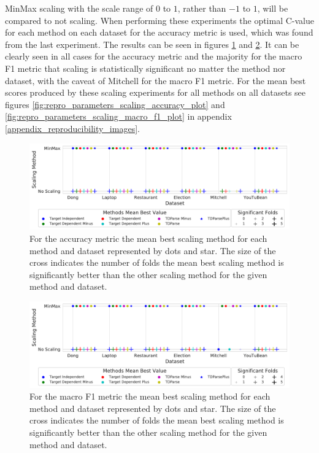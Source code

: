 MinMax scaling with the scale range of $0$ to $1$, rather than \citet{wang-etal-2017-tdparse} $-1$ to $1$, will be compared to not scaling. When performing these experiments the optimal C-value for each method on each dataset for the accuracy metric is used, which was found from the last experiment. The results can be seen in figures \ref{fig:repro_parameters_scaling_accuracy} and \ref{fig:repro_parameters_scaling_macro_f1}. It can be clearly seen in all cases for the accuracy metric and the majority for the macro F1 metric that scaling is statistically significant no matter the method nor dataset, with the caveat of Mitchell for the macro F1 metric. For the mean best scores produced by these scaling experiments for all methods on all datasets see figures \ref{fig:repro_parameters_scaling_accuracy_plot} and \ref{fig:repro_parameters_scaling_macro_f1_plot} in appendix \ref{appendix_reproducibility_images}.

\begin{figure}[!h]
    \centering
    \includegraphics[scale=0.47]{images/reproducibility/Parameters/Scaling/Scaling_Sig_Plot_Accuracy.pdf}
    \caption{For the accuracy metric the mean best scaling method for each method and dataset represented by dots and star. The size of the cross indicates the number of folds the mean best scaling method is significantly better than the other scaling method for the given method and dataset.}
    \label{fig:repro_parameters_scaling_accuracy}
\end{figure}
\begin{figure}[!h]
    \centering
    \includegraphics[scale=0.47]{images/reproducibility/Parameters/Scaling/Scaling_Sig_Plot_F1.pdf}
    \caption{For the macro F1 metric the mean best scaling method for each method and dataset represented by dots and star. The size of the cross indicates the number of folds the mean best scaling method is significantly better than the other scaling method for the given method and dataset.}
    \label{fig:repro_parameters_scaling_macro_f1}
\end{figure}


